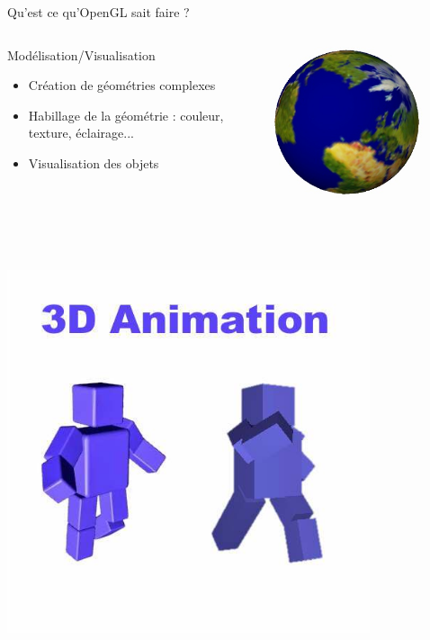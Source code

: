 \documentclass{beamer}
\begin{document}
\begin{frame}{Qu'est ce qu'OpenGL sait faire ?}
	\begin{columns}
		\begin{column}{0.55\textwidth}
			\begin{block}{Modélisation/Visualisation}
				\begin{itemize}
					\item Création de géométries complexes
					\item Habillage de la géométrie : couleur, texture, éclairage...
					\item Visualisation des objets
				\end{itemize}
			\end{block}
		\end{column}
		\begin{column}{0.4\textwidth}
			\centering
			\includegraphics[width=0.8\textwidth]{img/model_earth}
		\end{column}
	\end{columns}
	~\\
	\pause
	\begin{columns}
		\begin{column}{0.4\textwidth}
			\centering
			\includegraphics[width=0.8\textwidth]{img/animation}

\end{column}
\end{columns}
\end{frame}
\end{document}
